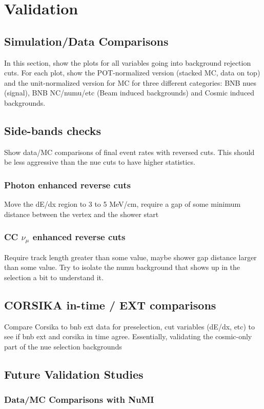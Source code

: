 
\section{Validation}

\subsection{Simulation/Data Comparisons}
In this section, show the plots for all variables going into background rejection cuts.  For each plot, show the POT-normalized version (stacked MC, data on top) and the unit-normalized version for MC for three different categories: BNB nues (signal), BNB NC/numu/etc (Beam induced backgrounds) and Cosmic induced backgrounds. 

\subsection{Side-bands checks}

Show data/MC comparisons of final event rates with reversed cuts.  This should be less aggressive than the nue cuts to have higher statistics.

\subsubsection{Photon enhanced reverse cuts}
Move the dE/dx region to 3 to 5 MeV/cm, require a gap of some minimum distance between the vertex and the shower start

\subsubsection{CC $\nu_{\mu}$ enhanced reverse cuts}
Require track length greater than some value, maybe shower gap distance larger than some value.  Try to isolate the numu background that shows up in the selection a bit to understand it.

\subsection{CORSIKA in-time / EXT comparisons}

Compare Corsika to bnb ext data for preselection, cut variables (dE/dx, etc) to see if bnb ext and corsika in time agree.  Essentially, validating the cosmic-only part of the nue selection backgrounds

\subsection{Future Validation Studies}

\subsubsection{Data/MC Comparisons with NuMI}
